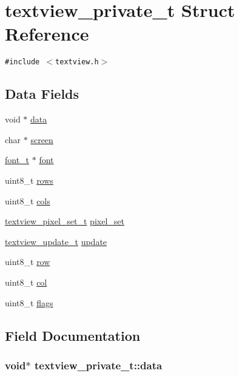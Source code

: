 \hypertarget{structtextview__private__t}{
\section{textview\_\-private\_\-t Struct Reference}
\label{structtextview__private__t}
}
{\tt \#include $<$textview.h$>$}

\subsection*{Data Fields}
\begin{CompactItemize}
\item 
void $\ast$ \hyperlink{structtextview__private__t_0f8baf6fe8f0f921b78b94aa6fa86aca}{data}
\item 
char $\ast$ \hyperlink{structtextview__private__t_d0b3ede8a1390cde8b4b20199f59d2c5}{screen}
\item 
\hyperlink{structfont__t}{font\_\-t} $\ast$ \hyperlink{structtextview__private__t_f3a70e1df9d29ea052de30b51673ec42}{font}
\item 
uint8\_\-t \hyperlink{structtextview__private__t_74d5f0c229fbc2c6c1328e719cd2ba8b}{rows}
\item 
uint8\_\-t \hyperlink{structtextview__private__t_e0e15a417d3bfa6b282a83e54c1a4435}{cols}
\item 
\hyperlink{textview_8h_e17d8d64d94113a46884d16a7c7766fe}{textview\_\-pixel\_\-set\_\-t} \hyperlink{structtextview__private__t_72583e750961016befe046419a57b2ac}{pixel\_\-set}
\item 
\hyperlink{textview_8h_ba50bf661c589b3ac971577f67d02b16}{textview\_\-update\_\-t} \hyperlink{structtextview__private__t_f53f840c067dfc4ed2beb2ac6e78fef1}{update}
\item 
uint8\_\-t \hyperlink{structtextview__private__t_ad6a939ebae8152e0cd7458af44b92c9}{row}
\item 
uint8\_\-t \hyperlink{structtextview__private__t_0f7a980fe4f1fa857e9b49d73c65a9bd}{col}
\item 
uint8\_\-t \hyperlink{structtextview__private__t_291b0574c0d4076365e4ac0519708954}{flags}
\end{CompactItemize}


\subsection{Field Documentation}
\hypertarget{structtextview__private__t_0f8baf6fe8f0f921b78b94aa6fa86aca}{
\subsubsection{\setlength{\rightskip}{0pt plus 5cm}void$\ast$ {\bf textview\_\-private\_\-t::data}}}
\label{structtextview__private__t_0f8baf6fe8f0f921b78b94aa6fa86aca}


